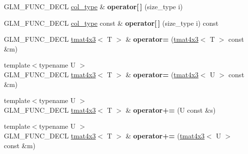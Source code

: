 \begin{DoxyCompactItemize}
\item 
\hypertarget{structglm_1_1detail_1_1tmat4x3_a6c91a6939e72a07834731272a7ee333c}{}G\+L\+M\+\_\+\+F\+U\+N\+C\+\_\+\+D\+E\+C\+L \hyperlink{structglm_1_1detail_1_1tvec3}{col\+\_\+type} \& {\bfseries operator\mbox{[}$\,$\mbox{]}} (size\+\_\+type i)\label{structglm_1_1detail_1_1tmat4x3_a6c91a6939e72a07834731272a7ee333c}

\item 
\hypertarget{structglm_1_1detail_1_1tmat4x3_a3c51ea05764cc0449bfd1da1ce552cc0}{}G\+L\+M\+\_\+\+F\+U\+N\+C\+\_\+\+D\+E\+C\+L \hyperlink{structglm_1_1detail_1_1tvec3}{col\+\_\+type} const \& {\bfseries operator\mbox{[}$\,$\mbox{]}} (size\+\_\+type i) const \label{structglm_1_1detail_1_1tmat4x3_a3c51ea05764cc0449bfd1da1ce552cc0}

\item 
\hypertarget{structglm_1_1detail_1_1tmat4x3_aa3181a3c75dbb5e906f78d94cd4f8b10}{}G\+L\+M\+\_\+\+F\+U\+N\+C\+\_\+\+D\+E\+C\+L \hyperlink{structglm_1_1detail_1_1tmat4x3}{tmat4x3}$<$ T $>$ \& {\bfseries operator=} (\hyperlink{structglm_1_1detail_1_1tmat4x3}{tmat4x3}$<$ T $>$ const \&m)\label{structglm_1_1detail_1_1tmat4x3_aa3181a3c75dbb5e906f78d94cd4f8b10}

\item 
\hypertarget{structglm_1_1detail_1_1tmat4x3_a4e1d49a1eda2e7f4ce9403c3e96cc447}{}{\footnotesize template$<$typename U $>$ }\\G\+L\+M\+\_\+\+F\+U\+N\+C\+\_\+\+D\+E\+C\+L \hyperlink{structglm_1_1detail_1_1tmat4x3}{tmat4x3}$<$ T $>$ \& {\bfseries operator=} (\hyperlink{structglm_1_1detail_1_1tmat4x3}{tmat4x3}$<$ U $>$ const \&m)\label{structglm_1_1detail_1_1tmat4x3_a4e1d49a1eda2e7f4ce9403c3e96cc447}

\item 
\hypertarget{structglm_1_1detail_1_1tmat4x3_a4b58234c4b05ac0c5702c259efcb0eec}{}{\footnotesize template$<$typename U $>$ }\\G\+L\+M\+\_\+\+F\+U\+N\+C\+\_\+\+D\+E\+C\+L \hyperlink{structglm_1_1detail_1_1tmat4x3}{tmat4x3}$<$ T $>$ \& {\bfseries operator+=} (U const \&s)\label{structglm_1_1detail_1_1tmat4x3_a4b58234c4b05ac0c5702c259efcb0eec}

\item 
\hypertarget{structglm_1_1detail_1_1tmat4x3_af41fbc292245b33e17b1b4b240700628}{}{\footnotesize template$<$typename U $>$ }\\G\+L\+M\+\_\+\+F\+U\+N\+C\+\_\+\+D\+E\+C\+L \hyperlink{structglm_1_1detail_1_1tmat4x3}{tmat4x3}$<$ T $>$ \& {\bfseries operator+=} (\hyperlink{structglm_1_1detail_1_1tmat4x3}{tmat4x3}$<$ U $>$ const \&m)\label{structglm_1_1detail_1_1tmat4x3_af41fbc292245b33e17b1b4b240700628}


\end{DoxyCompactItemize}
